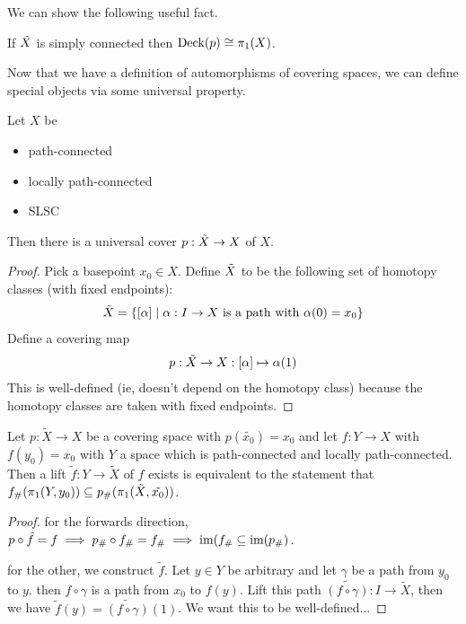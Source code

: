 We can show the following useful fact.

\begin{boxproposition}
    If $\Tilde{X}$ is simply connected then $\operatorname{Deck}\!\left( p \right) \cong \pi_1\!\left( X \right)$.
\end{boxproposition}

Now that we have a definition of automorphisms of covering spaces, we can define special objects via some universal property.

\begin{boxtheorem}
    Let $X$ be
    \begin{itemize}
        \item path-connected
        \item locally path-connected
        \item SLSC
    \end{itemize}
    Then there is a universal cover $p : \Tilde{X} \to X$ of $X$.
\end{boxtheorem}
\begin{proof}
    Pick a basepoint $x_0 \in X$. Define $\Tilde{X}$ to be the following set of homotopy classes (with fixed endpoints):
    \begin{align*}
        \Tilde{X} = \left\{ \left[ \alpha \right] \; \middle\vert \; \alpha : I \to X \text{ is a path with } \alpha(0) = x_0 \right\}
    \end{align*}
    Define a covering map
    \begin{align*}
        p : \Tilde{X} \to X : \left[ \alpha \right] \mapsto \alpha(1)
    \end{align*}
    This is well-defined (ie, doesn't depend on the homotopy class) because the homotopy classes are taken with fixed endpoints.

    \sorry
\end{proof}

\begin{boxlemma}
    Let $p:\tilde{X}\rightarrow X$ be a covering space with $p(\tilde{x_0})=x_0$ and let $f:Y\rightarrow X$ with $f(y_0)=x_0$ with $Y$ a space which is path-connected and locally path-connected. Then a lift $\tilde{f}:Y\rightarrow \tilde{X}$ of $f$ exists is equivalent to the statement that $f_{\#}(\pi_1(Y, y_0))\subseteq p_{\#}(\pi_1(\tilde{X}, \tilde{x_0}))$.
\end{boxlemma}
\begin{proof}
    for the forwards direction, $p\circ \tilde{f}=f\implies p_{\#}\circ f_{\#}=f_{\#}\implies \text{im}(f_{\#}\subseteq \text{im}(p_{\#})$.

    for the other, we construct $\tilde{f}$. Let $y\in Y$ be arbitrary and let $\gamma$ be a path from $y_0$ to $y$. then $f\circ \gamma$ is a path from $x_0$ to $f(y)$. Lift this path $\tilde{(f\circ \gamma)}:I\rightarrow \tilde{X}$, then we have $\tilde{f}(y)=\tilde{(f\circ \gamma)}(1)$. We want this to be well-defined...
\end{proof}

